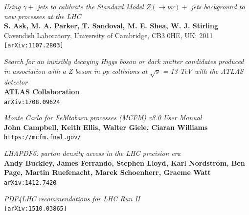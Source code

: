 \documentclass[11pt,a4paper,final]{report}
\begin{document}
\begin{thebibliography}{9}
	\textit{Using $\gamma +$ jets to calibrate the Standard Model $Z(\rightarrow \nu\nu)+$ jets background to new processes at the LHC}\\
	\textbf{S. Ask, M. A. Parker, T. Sandoval, M. E. Shea, W. J. Stirling}\\
Cavendish Laboratory, University of Cambridge, CB3 0HE, UK; 2011\\
	\texttt{[arXiv:1107.2803]}
	
	\textit{Search for an invisibly decaying Higgs boson or dark matter candidates produced in association with a Z boson in pp collisions at $\sqrt{s}$ = 13 TeV with the ATLAS detector}\\
	\textbf{ATLAS Collaboration}\\
	\texttt{arXiv:1708.09624}

	\textit{Monte Carlo for FeMtobarn processes (MCFM) v8.0 User Manual}\\
	\textbf{John Campbell, Keith Ellis, Walter Giele, Ciaran Williams}\\
	\texttt{https://mcfm.fnal.gov/}
	
	\textit{LHAPDF6: parton density access in the LHC precision era}\\
	\textbf{Andy Buckley, James Ferrando, Stephen Lloyd, Karl Nordstrom, Ben Page, Martin Ruefenacht, Marek Schoenherr, Graeme Watt}\\
	\texttt{arXiv:1412.7420}
	
	\textit{PDF4LHC recommendations for LHC Run II}\\
	\texttt{[arXiv:1510.03865]}

\end{thebibliography}
\end{document}
